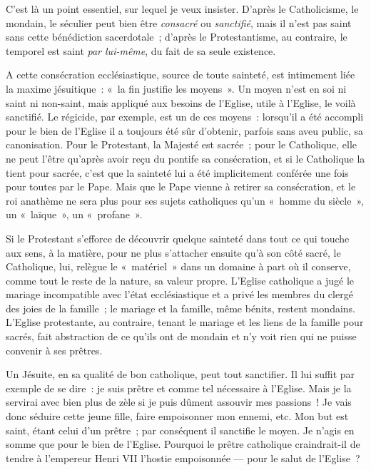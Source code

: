 \documentclass[french,twoside]{book} %
\begin{document}
C’est là un point essentiel, sur lequel je veux insister. D’après le Catholicisme, le mondain, le séculier peut bien être \emph{consacré} ou \emph{sanctifié}, mais il n’est pas saint sans cette bénédiction sacerdotale ; d’après le Protestantisme, au contraire, le temporel est saint \emph{par lui-même}, du fait de sa seule existence.\par
A cette consécration ecclésiastique, source de toute sainteté, est intimement liée la maxime jésuitique : « la fin justifie les moyens ». Un moyen n’est en soi ni saint ni non-saint, mais appliqué aux besoins de l’Eglise, utile à l’Eglise, le voilà sanctifié. Le régicide, par exemple, est un de ces moyens : lorsqu’il  a été accompli pour le bien de l’Eglise il a toujours été sûr d’obtenir, parfois sans aveu public, sa canonisation. Pour le Protestant, la Majesté est sacrée ; pour le Catholique, elle ne peut l’être qu’après avoir reçu du pontife sa consécration, et si le Catholique la tient pour sacrée, c’est que la sainteté lui a été implicitement conférée une fois pour toutes par le Pape. Mais que le Pape vienne à retirer sa consécration, et le roi anathème ne sera plus pour ses sujets catholiques qu’un « homme du siècle », un « laïque », un « profane ».\par
Si le Protestant s’efforce de découvrir quelque sainteté dans tout ce qui touche aux sens, à la matière, pour ne plus s’attacher ensuite qu’à son côté sacré, le Catholique, lui, relègue le « matériel » dans un domaine à part où il conserve, comme tout le reste de la nature, sa valeur propre. L’Eglise catholique a jugé le mariage incompatible avec l’état ecclésiastique et a privé les membres du clergé des joies de la famille ; le mariage et la famille, même bénits, restent mondains. L’Eglise protestante, au contraire, tenant le mariage et les liens de la famille pour sacrés, fait abstraction de ce qu’ils ont de mondain et n’y voit rien qui ne puisse convenir à ses prêtres.\par
Un Jésuite, en sa qualité de bon catholique, peut tout sanctifier. Il lui suffit par exemple de se dire : je suis prêtre et comme tel nécessaire à l’Eglise. Mais je la servirai avec bien plus de zèle si je puis dûment assouvir mes passions ! Je vais donc séduire cette jeune fille, faire empoisonner mon ennemi, etc. Mon but est saint, étant celui d’un prêtre ; par conséquent il sanctifie le moyen. Je n’agis en somme que pour le bien de l’Eglise. Pourquoi le prêtre catholique craindrait-il de tendre à l’empereur Henri VII l’hostie empoisonnée — pour le salut de l’Eglise ?\par
\end{document}
